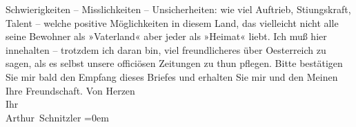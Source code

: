 \begin{ledgroupsized}[t]{13cm}
               Schwierigkeiten – Misslichkeiten – Unsicherheiten: wie viel Auftrieb, Sti{\geminationm}ungskraft, Talent – welche positive Möglichkeiten in
               diesem Land, das vielleicht
               nicht {\pb}alle seine Bewohner als »Vaterland« aber
               jeder als »Heimat« liebt. Ich muß hier innehalten – trotzdem ich daran bin, viel
               freundlicheres über Oesterreich zu sagen, als
               es \introOben{}selbst\introOben{} unsere officiösen Zeitungen zu thun pflegen.\pend
           \pstart
           Bitte bestätigen Sie mir bald den Empfang dieses Briefes und erhalten Sie mir und den
               Meinen Ihre Freundschaft.\pend
           \pstart
           Von Herzen{\\[\baselineskip]}Ihr{\\[\baselineskip]}\spacefill\mbox{Arthur Schnitzler}\pend
           \leftskip=0em{}
         
         \endnumbering{}\end{ledgroupsized}  \newcommand{\dateiname}{L02292}\newcommand{\titel}{Arthur Schnitzler an Georg Brandes, 2. 8. 1918}\newcommand{\editorInnen}{Martin Anton Müller und Gerd-Hermann Susen}
      